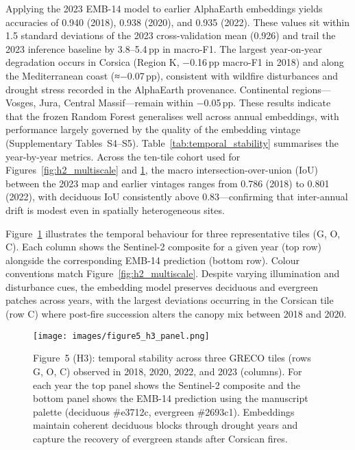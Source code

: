 \documentclass[utf8]{FrontiersinHarvard}
\begin{document}
Applying the 2023 EMB-14 model to earlier AlphaEarth embeddings yields accuracies of 0.940 (2018), 0.938 (2020), and 0.935 (2022). These values sit within 1.5 standard deviations of the 2023 cross-validation mean (0.926) and trail the 2023 inference baseline by 3.8–5.4\,pp in macro-F1. The largest year-on-year degradation occurs in Corsica (Region K, −0.16\,pp macro-F1 in 2018) and along the Mediterranean coast (≈−0.07\,pp), consistent with wildfire disturbances and drought stress recorded in the AlphaEarth provenance. Continental regions—Vosges, Jura, Central Massif—remain within −0.05\,pp. These results indicate that the frozen Random Forest generalises well across annual embeddings, with performance largely governed by the quality of the embedding vintage (Supplementary Tables~S4–S5). Table~\ref{tab:temporal_stability} summarises the year-by-year metrics. Across the ten-tile cohort used for Figures~\ref{fig:h2_multiscale} and \ref{fig:h3_temporal}, the macro intersection-over-union (IoU) between the 2023 map and earlier vintages ranges from 0.786 (2018) to 0.801 (2022), with deciduous IoU consistently above 0.83—confirming that inter-annual drift is modest even in spatially heterogeneous sites.

Figure~\ref{fig:h3_temporal} illustrates the temporal behaviour for three representative tiles (G, O, C). Each column shows the Sentinel-2 composite for a given year (top row) alongside the corresponding EMB-14 prediction (bottom row). Colour conventions match Figure~\ref{fig:h2_multiscale}. Despite varying illumination and disturbance cues, the embedding model preserves deciduous and evergreen patches across years, with the largest deviations occurring in the Corsican tile (row C) where post-fire succession alters the canopy mix between 2018 and 2020.

\begin{figure}[H]
    \centering
    \texttt{[image: images/figure5\_h3\_panel.png]}
    \caption{Figure~5 (H3): temporal stability across three GRECO tiles (rows G, O, C) observed in 2018, 2020, 2022, and 2023 (columns). For each year the top panel shows the Sentinel-2 composite and the bottom panel shows the EMB-14 prediction using the manuscript palette (deciduous \#e3712c, evergreen \#2693c1). Embeddings maintain coherent deciduous blocks through drought years and capture the recovery of evergreen stands after Corsican fires.}
    \label{fig:h3_temporal}
\end{figure}
\end{document}

